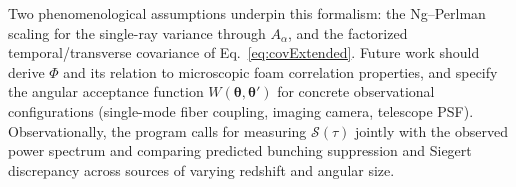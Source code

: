 \documentclass[aps,prd,onecolumn,amsmath,amssymb]{revtex4-2}
\begin{document}
Two phenomenological assumptions underpin this formalism: the Ng--Perlman
scaling for the single-ray variance through $A_\alpha$, and the factorized
temporal/transverse covariance of Eq.~\eqref{eq:covExtended}.
Future work should derive $\Phi$ and its relation to microscopic foam
correlation properties, and specify the angular acceptance function
$W(\boldsymbol{\theta},\boldsymbol{\theta}')$ for concrete observational
configurations (single-mode fiber coupling, imaging camera, telescope PSF).
Observationally, the program calls for measuring $\mathcal{S}(\tau)$ jointly
with the observed power spectrum and comparing predicted bunching
suppression and Siegert discrepancy across sources of varying redshift and
angular size.

\begin{acknowledgments}
\end{acknowledgments}



\end{document}
